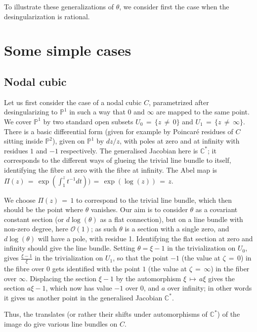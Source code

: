 \documentclass[12pt,reqno]{amsart}
\numberwithin{equation}{section}
\theoremstyle{definition}
\theoremstyle{remark}
\def\bC{{\mathbb {C}}}
\def\bP{{\mathbb {P}}}
\def\pO{{\mathcal O}}
\begin{document}
To illustrate these generalizations of $\theta$, we consider first the case when the desingularization is 
rational.

\section{Some simple cases}

\subsection {Nodal cubic}
 
Let us first consider the case of a nodal cubic $C$, parametrized after desingularizing to $\bP^1$ in such 
a way that $0$ and $\infty$ are mapped to the same point. We cover $\bP^1$ by two standard open subsets $U_0
\,=\, \{z\,\neq\, 0\}$ and $U_1\,=\, \{z\,\neq\, \infty\}$. There is a basic differential form (given for example by Poincar\'e
residues of $C$ sitting 
inside $\bP^2$),   given on $\bP^1$ by $dz/z$, with poles at 
zero and at infinity with residues $1$ and $-1$ respectively.
The generalised Jacobian here is $\bC^*$; it
corresponds to the different ways of glueing the trivial line bundle to 
itself, identifying the fibre at zero with the fibre at infinity.
The Abel map is $\Pi(z) \,=\,\exp (\int_1^zt^{-1}dt)) \,=\,\exp (\log( z)) \,=\, z$.

We choose $\Pi(z)\,=\, 1$ to correspond to the trivial line
bundle, which then should be the point where $\theta$ vanishes. Our aim is
to consider $\theta$ as a covariant constant section (or $d\log (\theta)$ as a flat connection), but
on a line bundle with non-zero degree, here $\pO(1)$; as such $\theta$ is a section with a single zero, and $d\log (\theta)$ will have a pole, with residue 1. 
Identifying the flat section at zero and infinity should give the line bundle. Setting $\theta = \xi-1$ in the
trivialization on $U_0$,  gives $\frac{\xi-1}{\xi}$ in the trivialization on $U_1$,
so that the point $-1$ (the value at $\zeta \,=\, 0$) in the fibre over $0$ gets identified
with the point $1$ (the value at $\zeta \,=\, \infty$) in the fiber over $\infty$. Displacing the
section $\xi-1$ by the automorphism $\xi \,\longmapsto\, a\xi$ gives the section $a\xi-1$, which now
has value $-1$ over $0$, and $a$ over infinity; in other words it gives us another point in
the generalised Jacobian $\bC^*$. 
 
Thus, the translates (or rather their shifts under automorphisms of $\bC^*$) of the image do give 
various line bundles on $C$.
 
\end{document}
